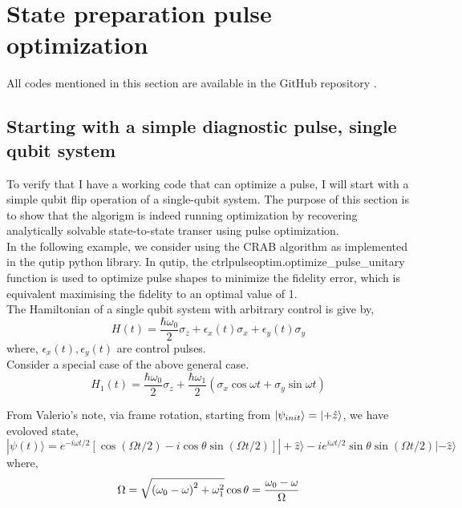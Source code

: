 \documentclass[12pt]{article}
\begin{document}
\section{State preparation pulse optimization}
All codes mentioned in this section are available in the GitHub repository \cite{lzl_github_repo}.

\subsection{Starting with a simple diagnostic pulse, single qubit system}
To verify that I have a working code that can optimize a pulse, 
I will start with a simple qubit flip operation of a single-qubit system.
The purpose of this section is to show that the algorigm is indeed running optimization
by recovering analytically solvable state-to-state transer using pulse optimization. 
\\
In the following example, we consider using the CRAB algorithm as implemented in the 
qutip python library. In qutip, the ctrlpulseoptim.optimize\_pulse\_unitary function is used 
to optimize pulse shapes to minimize the fidelity error, which is equivalent maximising the fidelity to an optimal value of 1.
\\
The Hamiltonian of a single qubit system with arbitrary control is give by, 
\begin{equation}
    H(t) = \frac{\hbar \omega_0}{2} \sigma_z + \epsilon_x(t)\sigma_x + \epsilon_y(t)\sigma_y 
\end{equation}
where, $\epsilon_x(t), \epsilon_y(t)$ are control pulses.  
\\
Consider a special case of the above general case. 
\begin{equation}
    H_1(t) = \frac{\hbar \omega_0}{2} \sigma_z + \frac{\hbar \omega_1}{2}(\sigma_x\cos{\omega t} + \sigma_y\sin{\omega t})    
\end{equation}

From Valerio's note, via frame rotation, starting from $\ket{\psi_{init}} = \ket{+\hat{z}}$, 
we have evoloved state, 
\begin{equation}
    |\psi(t)\rangle=e^{-i \omega t / 2}[\cos (\Omega t / 2)-i \cos \theta \sin (\Omega t / 2)]|+\hat{z}\rangle-i e^{i \omega t / 2} \sin \theta \sin (\Omega t / 2)|-\hat{z}\rangle
\end{equation}
where, 
$$
\Omega=\sqrt{\left(\omega_0-\omega\right)^2+\omega_1^2} \\
\cos \theta=\frac{\omega_0-\omega}{\Omega}
$$
\end{document}
